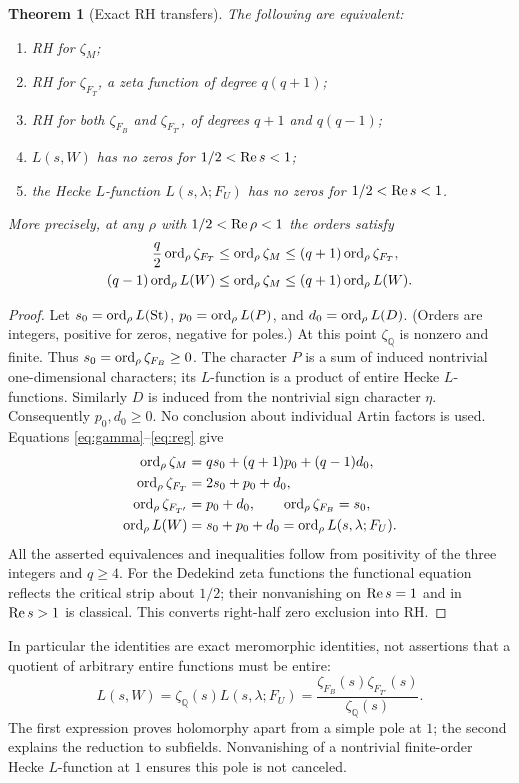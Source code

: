\documentclass[11pt]{article}
\newtheorem{theorem}{Theorem}[section]
\theoremstyle{remark}\newtheorem{remark}[theorem]{Remark}
\newcommand{\Q}{\mathbb Q}\newcommand{\C}{\mathbb C}\newcommand{\F}{\mathbb F}\newcommand{\one}{\mathbf 1}\newcommand{\St}{\mathrm{St}}\newcommand{\Gg}{\Gamma}\newcommand{\PT}{\mathcal P}\newcommand{\eps}{\varepsilon}
\begin{document}
\begin{theorem}[Exact RH transfers]\label{thm:transfer}
The following are equivalent:
\begin{enumerate}
\item RH for $\zeta_M$;
\item RH for $\zeta_{F_T}$, a zeta function of degree $q(q+1)$;
\item RH for both $\zeta_{F_B}$ and $\zeta_{F_{T'}}$, of degrees $q+1$ and $q(q-1)$;
\item $L(s,W)$ has no zeros for $1/2<\operatorname{Re} s<1$;
\item the Hecke $L$-function $L(s,\lambda;F_U)$ has no zeros for $1/2<\operatorname{Re} s<1$.
\end{enumerate}
More precisely, at any $\rho$ with $1/2<\operatorname{Re}\rho<1$ the orders satisfy
\begin{align}
 \frac q2\operatorname{ord}_\rho\zeta_{F_T}&\le\operatorname{ord}_\rho\zeta_M
 \le(q+1)\operatorname{ord}_\rho\zeta_{F_T},\label{eq:ineq1}\\
 (q-1)\operatorname{ord}_\rho L(W)&\le\operatorname{ord}_\rho\zeta_M
 \le(q+1)\operatorname{ord}_\rho L(W).\label{eq:ineq2}
\end{align}
\end{theorem}
\begin{proof}
Let $s_0=\ord_\rho L(\St)$, $p_0=\operatorname{ord}_\rho L(P)$, and $d_0=\operatorname{ord}_\rho L(D)$. (Orders are integers, positive for zeros, negative for poles.) At this point $\zeta_\Q$ is nonzero and finite. Thus $s_0=\operatorname{ord}_\rho\zeta_{F_B}\ge0$. The character $P$ is a sum of induced nontrivial one-dimensional characters; its $L$-function is a product of entire Hecke $L$-functions. Similarly $D$ is induced from the nontrivial sign character $\eta$. Consequently $p_0,d_0\ge0$. No conclusion about individual Artin factors is used. Equations \eqref{eq:gamma}--\eqref{eq:reg} give
\begin{align*}
 \operatorname{ord}_\rho\zeta_M&=qs_0+(q+1)p_0+(q-1)d_0,\\
 \operatorname{ord}_\rho\zeta_{F_T}&=2s_0+p_0+d_0,\\
 \operatorname{ord}_\rho\zeta_{F_{T'}}&=p_0+d_0,\qquad
 \operatorname{ord}_\rho\zeta_{F_B}=s_0,\\
 \operatorname{ord}_\rho L(W)&=s_0+p_0+d_0=\operatorname{ord}_\rho L(s,\lambda;F_U).
\end{align*}
All the asserted equivalences and inequalities follow from positivity of the three integers and $q\ge4$. For the Dedekind zeta functions the functional equation reflects the critical strip about $1/2$; their nonvanishing on $\operatorname{Re} s=1$ and in $\operatorname{Re} s>1$ is classical. This converts right-half zero exclusion into RH.
\end{proof}
In particular the identities are exact meromorphic identities, not assertions that a quotient of arbitrary entire functions must be entire:
\[
 \boxed{L(s,W)=\zeta_\Q(s)L(s,\lambda;F_U)
       =\frac{\zeta_{F_B}(s)\zeta_{F_{T'}}(s)}{\zeta_\Q(s)}.}
\]
The first expression proves holomorphy apart from a simple pole at $1$; the second explains the reduction to subfields. Nonvanishing of a nontrivial finite-order Hecke $L$-function at $1$ ensures this pole is not canceled.
\end{document}
